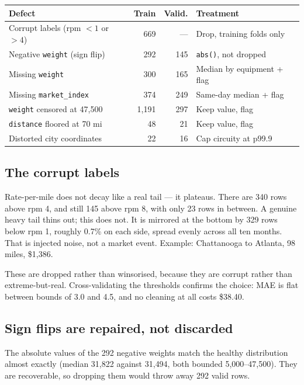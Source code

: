 \documentclass[11pt,a4paper]{article}
\begin{document}
\begin{center}
\small
\begin{tabular}{@{}p{6.6cm}rrp{4.4cm}@{}}
\toprule
\textbf{Defect} & \textbf{Train} & \textbf{Valid.} & \textbf{Treatment}\\
\midrule
Corrupt labels (rpm $<1$ or $>4$) & 669 & --- & Drop, training folds only\\
Negative \texttt{weight} (sign flip) & 292 & 145 & \texttt{abs()}, not dropped\\
Missing \texttt{weight} & 300 & 165 & Median by equipment + flag\\
Missing \texttt{market\_index} & 374 & 249 & Same-day median + flag\\
\texttt{weight} censored at 47{,}500 & 1{,}191 & 297 & Keep value, flag\\
\texttt{distance} floored at 70 mi & 48 & 21 & Keep value, flag\\
Distorted city coordinates & 22 & 16 & Cap circuity at p99.9\\
\bottomrule
\end{tabular}
\end{center}

\subsection{The corrupt labels}

Rate-per-mile does not decay like a real tail --- it plateaus. There are 340 rows
above rpm 4, and still 145 above rpm 8, with only 23 rows in between. A genuine
heavy tail thins out; this does not. It is mirrored at the bottom by 329 rows
below rpm 1, roughly 0.7\% on each side, spread evenly across all ten months.
That is injected noise, not a market event. Example: Chattanooga to Atlanta, 98
miles, \$1{,}386.

These are dropped rather than winsorised, because they are corrupt rather than
extreme-but-real. Cross-validating the thresholds confirms the choice: MAE is
flat between bounds of 3.0 and 4.5, and no cleaning at all costs \$38.40.

\subsection{Sign flips are repaired, not discarded}

The absolute values of the 292 negative weights match the healthy distribution
almost exactly (median 31{,}822 against 31{,}494, both bounded 5{,}000--47{,}500).
They are recoverable, so dropping them would throw away 292 valid rows.
\end{document}

